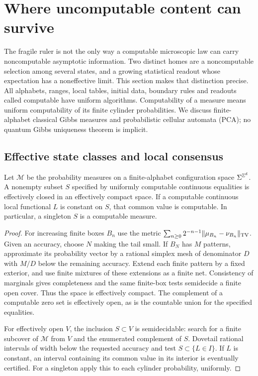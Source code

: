 \section{Where uncomputable content can survive}
\label{sec:states}
The fragile ruler is not the only way a computable microscopic law
can carry noncomputable asymptotic information. Two distinct homes
are a noncomputable selection among several states, and a growing
statistical readout whose expectation has a noneffective limit.
This section makes that distinction precise. All alphabets, ranges,
local tables, initial data, boundary rules and readouts called
computable have uniform algorithms. Computability of a measure means
uniform computability of its finite cylinder probabilities.
We discuss finite-alphabet classical Gibbs measures and
probabilistic cellular automata (PCA); no quantum Gibbs uniqueness
theorem is implicit.

\subsection{Effective state classes and local consensus}
\begin{lemma}
\label{lem:state-compact}
Let $\mathcal M$ be the probability measures on a finite-alphabet
configuration space $\Sigma^{\mathbb Z^d}$. A nonempty subset $S$ specified
by uniformly computable continuous equalities is effectively closed
in an effectively compact space. If a computable continuous local
functional $L$ is constant on $S$, that common value is computable.
In particular, a singleton $S$ is a computable measure.
\end{lemma}
\begin{proof}
For increasing finite boxes $B_n$ use the metric
$\sum_{n\geq0}2^{-n-1}\|\mu_{B_n}-\nu_{B_n}\|_{\rm TV}$.
Given an accuracy, choose $N$ making the tail small. If $B_N$ has
$M$ patterns, approximate its probability vector by a rational
simplex mesh of denominator $D$ with $M/D$ below the remaining
accuracy. Extend each finite pattern by a fixed exterior, and use
finite mixtures of these extensions as a finite net. Consistency
of marginals gives completeness and the same finite-box tests
semidecide a finite open cover. Thus the space is effectively compact.
The complement of a computable zero set is effectively open, as is
the countable union for the specified equalities.

For effectively open $V$, the inclusion $S\subset V$ is semidecidable:
search for a finite subcover of $\mathcal M$ from $V$ and the
enumerated complement of $S$. Dovetail rational intervals of width
below the requested accuracy and test $S\subset\{L\in I\}$.
If $L$ is constant, an interval containing its common value in its
interior is eventually certified. For a singleton apply this to
each cylinder probability, uniformly.
\end{proof}

